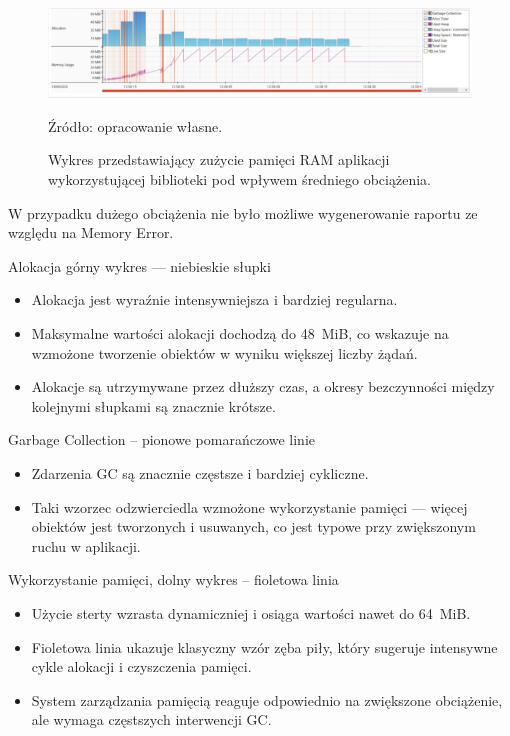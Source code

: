 \documentclass[runningheads,12pt]{llncs}
\begin{document}
\newpage

\begin{figure}
    \includegraphics[width=\linewidth]{images/library-memory-midle-graph.jpg}
    \caption{Wykres przedstawiający zużycie pamięci RAM aplikacji wykorzystującej biblioteki pod wpływem średniego obciążenia.} \label{fig1}
    \vspace{0.5em}
    {\small Źródło: opracowanie własne.}
\end{figure}

W przypadku dużego obciążenia nie było możliwe wygenerowanie raportu ze względu na Memory Error.

Alokacja górny wykres — niebieskie słupki

\begin{itemize}
  \item Alokacja jest wyraźnie intensywniejsza i bardziej regularna.
  \item Maksymalne wartości alokacji dochodzą do 48~MiB, co wskazuje na wzmożone tworzenie obiektów w wyniku większej liczby żądań.
  \item Alokacje są utrzymywane przez dłuższy czas, a okresy bezczynności między kolejnymi słupkami są znacznie krótsze.
\end{itemize}

Garbage Collection – pionowe pomarańczowe linie

\begin{itemize}
  \item Zdarzenia GC są znacznie częstsze i bardziej cykliczne.
  \item Taki wzorzec odzwierciedla wzmożone wykorzystanie pamięci — więcej obiektów jest tworzonych i usuwanych, co jest typowe przy zwiększonym ruchu w aplikacji.
\end{itemize}

Wykorzystanie pamięci, dolny wykres – fioletowa linia

\begin{itemize}
  \item Użycie sterty wzrasta dynamiczniej i osiąga wartości nawet do 64~MiB.
  \item Fioletowa linia ukazuje klasyczny wzór zęba piły, który sugeruje intensywne cykle alokacji i czyszczenia pamięci.
  \item System zarządzania pamięcią reaguje odpowiednio na zwiększone obciążenie, ale wymaga częstszych interwencji GC.
\end{itemize}
\end{document}
